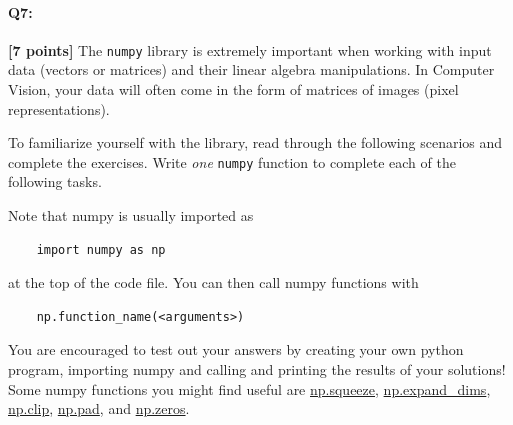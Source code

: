 




\pagebreak
\paragraph{Q7:} \textbf{[7 points]} The \texttt{numpy} library is extremely important when working with input data (vectors or matrices) and their linear algebra manipulations. In Computer Vision, your data will often come in the form of matrices of images (pixel representations). 

 To familiarize yourself with the library, read through the following scenarios and complete the exercises. Write \emph{one} \texttt{numpy} function to complete each of the following tasks.

Note that numpy is usually imported as
\begin{verbatim}
    import numpy as np
\end{verbatim}
at the top of the code file. You can then call numpy functions with \begin{verbatim}
    np.function_name(<arguments>)
\end{verbatim}
You are encouraged to test out your answers by creating your own python program, importing numpy and calling and printing the results of your solutions! Some numpy functions you might find useful are \href{https://numpy.org/doc/stable/reference/generated/numpy.squeeze.html}{np.squeeze}, \href{https://numpy.org/doc/stable/reference/generated/numpy.expand_dims.html}{np.expand\_dims}, \href{https://numpy.org/doc/stable/reference/generated/numpy.clip.html}{np.clip}, \href{https://numpy.org/doc/stable/reference/generated/numpy.pad.html}{np.pad}, and \href{https://numpy.org/doc/stable/reference/generated/numpy.zeros.html}{np.zeros}.

